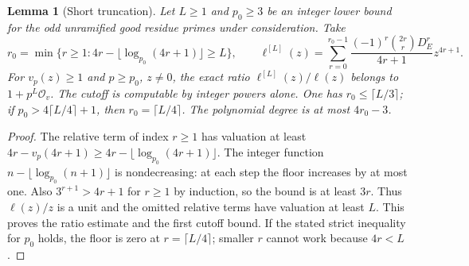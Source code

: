 \documentclass[11pt]{article}
\newtheorem{lemma}[theorem]{Lemma}
\begin{document}
\begin{lemma}[Short truncation]\label{lem:short}
Let $L\ge1$ and $p_0\ge3$ be an integer lower bound for the odd
unramified good residue primes under consideration. Take
\begin{equation}\label{eq:cutoff}
 r_0=\min\{r\ge1: 4r-\lfloor\log_{p_0}(4r+1)\rfloor\ge L\},\qquad
 \ell^{[L]}(z)=\sum_{r=0}^{r_0-1}
 \frac{(-1)^r\binom{2r}{r}D_E^r}{4r+1}z^{4r+1}.
\end{equation}
For $v_p(z)\ge1$ and $p\ge p_0$, $z\ne0$, the exact ratio
$\ell^{[L]}(z)/\ell(z)$ belongs to $1+p^L\mathcal O_v$.
The cutoff is computable by integer powers alone. One has
$r_0\le\lceil L/3\rceil$; if $p_0>4\lceil L/4\rceil+1$, then
$r_0=\lceil L/4\rceil$. The polynomial degree is at most $4r_0-3$.
\end{lemma}
\begin{proof}
The relative term of index $r\ge1$ has valuation at least
$4r-v_p(4r+1)\ge4r-\lfloor\log_{p_0}(4r+1)\rfloor$.
The integer function $n-\lfloor\log_{p_0}(n+1)\rfloor$ is
nondecreasing: at each step the floor increases by at most one.
Also $3^{r+1}>4r+1$ for $r\ge1$ by induction, so the bound is
at least $3r$. Thus $\ell(z)/z$ is a unit and the omitted relative
terms have valuation at least $L$. This proves the ratio estimate
and the first cutoff bound. If the stated strict inequality for
$p_0$ holds, the floor is zero at $r=\lceil L/4\rceil$; smaller $r$
cannot work because $4r<L$.
\end{proof}
\end{document}
